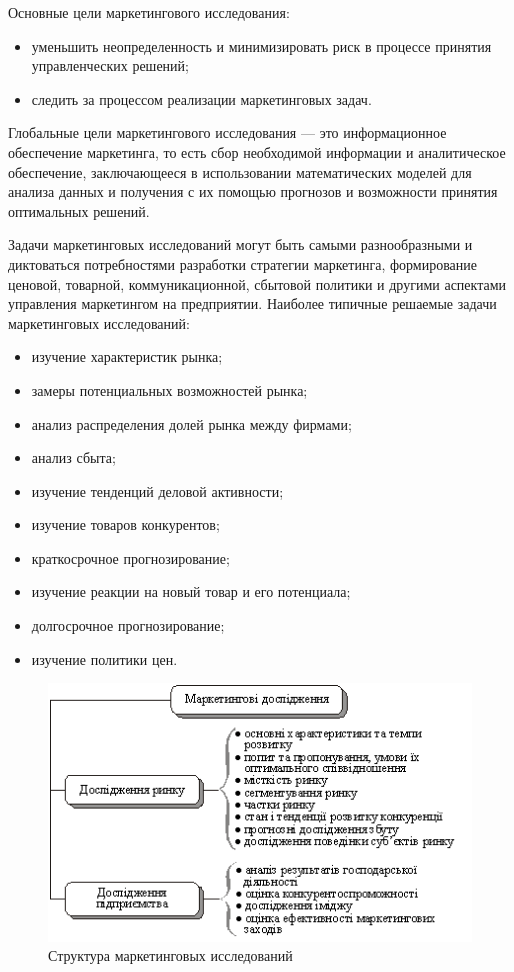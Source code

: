 \documentclass[a4paper,12pt,oneside,final]{extarticle}
\numberwithin{equation}{section}
\begin{document}
Основные цели маркетингового исследования:
\begin{itemize}
	\item уменьшить неопределенность и минимизировать риск в процессе принятия управленческих решений;
	\item следить за процессом реализации маркетинговых задач.
\end{itemize}

Глобальные цели маркетингового исследования --- это информационное обеспечение маркетинга, то есть сбор необходимой информации и аналитическое обеспечение, заключающееся в использовании математических моделей для анализа данных и получения с их помощью прогнозов и возможности принятия оптимальных решений.

Задачи маркетинговых исследований могут быть самыми разнообразными и диктоваться потребностями разработки стратегии маркетинга, формирование ценовой, товарной, коммуникационной, сбытовой политики и другими аспектами управления маркетингом на предприятии. 
Наиболее типичные решаемые задачи маркетинговых исследований:
\begin{itemize}
	\item изучение характеристик рынка;
	\item замеры потенциальных возможностей рынка;
	\item анализ распределения долей рынка между фирмами;
	\item анализ сбыта;
	\item изучение тенденций деловой активности;
	\item изучение товаров конкурентов;
	\item краткосрочное прогнозирование;
	\item изучение реакции на новый товар и его потенциала;
	\item долгосрочное прогнозирование;
	\item изучение политики цен.
\end{itemize}

\begin{figure}[h]
	\centering
	\includegraphics{management-figures/marketing_structure}
	\caption{Структура маркетинговых исследований}
\end{figure}
\end{document}
